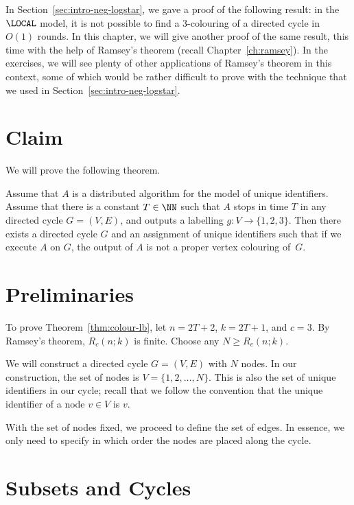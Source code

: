 
In Section~\ref{sec:intro-neg-logstar}, we gave a proof of the following result: in the $\LOCAL$ model, it is not possible to find a $3$-colouring of a directed cycle in $O(1)$ rounds. In this chapter, we will give another proof of the same result, this time with the help of Ramsey's theorem (recall Chapter~\ref{ch:ramsey}). In the exercises, we will see plenty of other applications of Ramsey's theorem in this context, some of which would be rather difficult to prove with the technique that we used in Section~\ref{sec:intro-neg-logstar}.


\section{Claim}

We will prove the following theorem.

\begin{theorem}\label{thm:colour-lb}
    Assume that $A$ is a distributed algorithm for the model of unique identifiers. Assume that there is a constant $T \in \NN$ such that $A$ stops in time $T$ in any directed cycle $G = (V,E)$, and outputs a labelling $g\colon V \to \{1,2,3\}$. Then there exists a directed cycle $G$ and an assignment of unique identifiers such that if we execute $A$ on $G$, the output of $A$ is not a proper vertex colouring of~$G$.
\end{theorem}


\section{Preliminaries}

To prove Theorem~\ref{thm:colour-lb}, let $n = 2T+2$, $k = 2T+1$, and $c = 3$. By Ramsey's theorem, $R_c(n;k)$ is finite. Choose any $N \ge R_c(n;k)$.

We will construct a directed cycle $G = (V,E)$ with $N$ nodes. In our construction, the set of nodes is $V = \{1,2,\dotsc,N\}$. This is also the set of unique identifiers in our cycle; recall that we follow the convention that the unique identifier of a node $v \in V$ is $v$.

With the set of nodes fixed, we proceed to define the set of edges. In essence, we only need to specify in which order the nodes are placed along the cycle.


\section{Subsets and Cycles}

